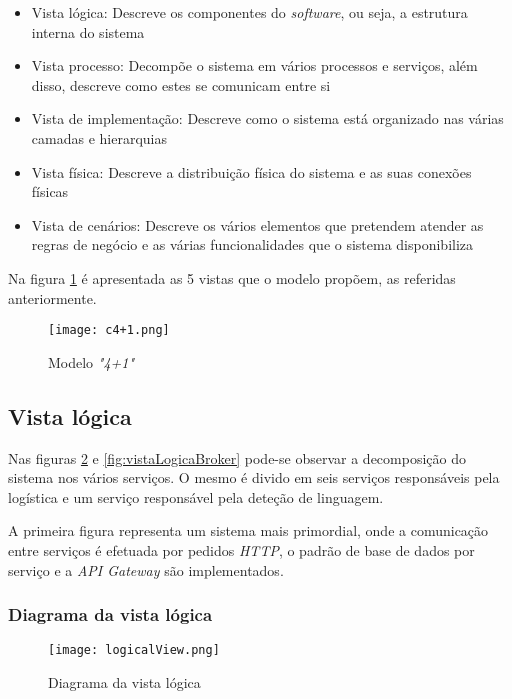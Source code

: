\begin{itemize}
    \item Vista lógica: Descreve os componentes do \textit{software}, ou seja, a estrutura interna do sistema
    \item Vista processo: Decompõe o sistema em vários processos e serviços, além disso, descreve como estes se comunicam entre si
    \item Vista de implementação: Descreve como o sistema está organizado nas várias camadas e hierarquias
    \item Vista física: Descreve a distribuição física do sistema e as suas conexões físicas
    \item Vista de cenários: Descreve os vários elementos que pretendem atender as regras de negócio e as várias funcionalidades que o sistema disponibiliza
\end{itemize}

Na figura \ref{fig:c4+1} é apresentada as 5 vistas que o modelo propõem, as referidas anteriormente.

\begin{figure}[H]
    \centering
    \texttt{[image: c4+1.png]}
    \caption{Modelo \textit{"4+1"} \cite{c4+1}}
    \label{fig:c4+1}
\end{figure}


\subsection{Vista lógica}

Nas figuras \ref{fig:vistaLogica} e \ref{fig:vistaLogicaBroker} pode-se observar a decomposição do sistema nos vários serviços. O mesmo é divido em seis serviços responsáveis pela logística e um serviço responsável pela deteção de linguagem.

A primeira figura representa um sistema mais primordial, onde a comunicação entre serviços é efetuada por pedidos \textit{HTTP}, o padrão de base de dados por serviço e a \textit{API Gateway} são implementados.

\subsubsection{Diagrama da vista lógica}

\begin{figure}[H]
    \centering
    \texttt{[image: logicalView.png]}
    \caption{Diagrama da vista lógica}
    \label{fig:vistaLogica}
\end{figure}

